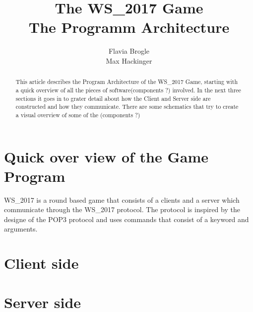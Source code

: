 \documentclass[11pt,a4paper]{article}
\title{The WS\_2017 Game \\ The Programm Architecture}
\author{Flavia Brogle \\ Max Hackinger}
\begin{document}
	\maketitle
  \tableofcontents
  
\begin{abstract}
  This article describes the Program Architecture of the WS\_2017 Game, starting with a quick overview of all the pieces of software(components ?) involved. In the next three sections it goes in to grater detail about how the Client and Server side are constructed and how they communicate. There are some schematics that try to create a visual overview of some of the (components ?) 
\end{abstract}  
  \clearpage
	\section{Quick over view of the Game Program}
	  WS\_2017 is a round based game that consists of a clients and a server which communicate through the WS\_2017 protocol. The protocol is inspired by the designe of the POP3 protocol and uses commands that consist of a keyword and arguments.
		\subsection{}
		\subsection{}
		\subsection{}
	\clearpage
	\section{Client side}
		\subsection{}
		\subsection{}
		\subsection{} 
	\clearpage
	\section{Server side}
\end{document}
